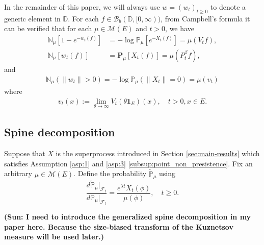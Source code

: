\documentclass[12pt,a4paper]{amsart}
\numberwithin{equation}{section}
\theoremstyle{plain}
\theoremstyle{definition}
\begin{document}
In the remainder of this paper, we will always use $w = (w_t)_{t\geq 0}$ to denote a generic element in $\mathbb D$.
For each $f\in \mathcal B_b(\mathbb D, [0,\infty))$, from Campbell's formula it can be verified that for each $\mu\in \mathcal M(E)$ and $t>0$, we have
\begin{align}\label{eq: kuznetsov Laplace}
 	\mathbb N_\mu \left[1-e^{-w_t(f) }\right]
 	&=-\log \mathbb P_\mu \left[ e^{-X_t(f)} \right] 
    = \mu(V_t f),
 	\\ \mathbb N_\mu [w_t(f)]
 	&= \mathbf P_\mu [X_t(f)]
    =\mu(P_t^{\beta}f),
\end{align}
and
\begin{align}
  \label{eq:Nmeasure_survive_is_superprocess_extinction}
 	\mathbb N_\mu( \|w_t\| > 0)
 	=-\log\mathbb P_\mu( \| X_t\|= 0)
  = \mu(v_t)
\end{align}
where 
\begin{align}
  v_t(x) := \lim_{\theta \to \infty} V_t(\theta  \mathbf 1_E)(x),
  \quad t>0, x\in E.
\end{align}
\subsection{Spine decomposition}
Suppose that $X$ is the superprocess introduced in Section \ref{sec:main-results} which satisfies Assumption \ref{asp:1} and \ref{asp:3} \eqref{subsup:point_non_presistence}.
Fix an arbitrary $\mu\in \mathcal M(E)$.
Define the probability $\widetilde {\mathbb P}_\mu$ using
\begin{equation} \label{eq:martingale_transformation}
	\frac{d\widetilde{\mathbb P}_\mu|_{\mathscr F_t}}{d\mathbb P_\mu|_{\mathscr F_t}}
	=\frac{e^{\lambda t} X_t(\phi)}{\mu(\phi) },
	\quad t\geq 0.
\end{equation}


{\bf (Sun: I need to introduce the generalized spine decomposition in my paper here. Because the size-biased transform of the Kuznetsov measure will be used later.)}
\end{document}
